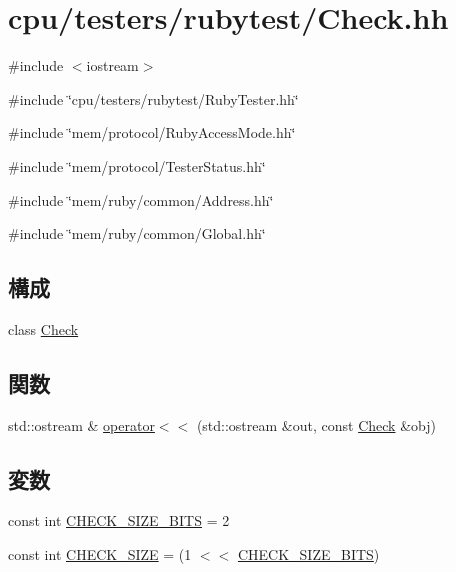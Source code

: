 \hypertarget{Check_8hh}{
\section{cpu/testers/rubytest/Check.hh}
\label{Check_8hh}
}
{\ttfamily \#include $<$iostream$>$}\par
{\ttfamily \#include \char`\"{}cpu/testers/rubytest/RubyTester.hh\char`\"{}}\par
{\ttfamily \#include \char`\"{}mem/protocol/RubyAccessMode.hh\char`\"{}}\par
{\ttfamily \#include \char`\"{}mem/protocol/TesterStatus.hh\char`\"{}}\par
{\ttfamily \#include \char`\"{}mem/ruby/common/Address.hh\char`\"{}}\par
{\ttfamily \#include \char`\"{}mem/ruby/common/Global.hh\char`\"{}}\par
\subsection*{構成}
\begin{DoxyCompactItemize}
\item 
class \hyperlink{classCheck}{Check}
\end{DoxyCompactItemize}
\subsection*{関数}
\begin{DoxyCompactItemize}
\item 
std::ostream \& \hyperlink{Check_8hh_ad904cac29a8613c671ee484b326cbcaa}{operator$<$$<$} (std::ostream \&out, const \hyperlink{classCheck}{Check} \&obj)
\end{DoxyCompactItemize}
\subsection*{変数}
\begin{DoxyCompactItemize}
\item 
const int \hyperlink{Check_8hh_ab082b7c215fc32d2bcf27291d93a616d}{CHECK\_\-SIZE\_\-BITS} = 2
\item 
const int \hyperlink{Check_8hh_a9a4e4d92b84c20d87d22cd139b0781d9}{CHECK\_\-SIZE} = (1 $<$$<$ \hyperlink{Check_8hh_ab082b7c215fc32d2bcf27291d93a616d}{CHECK\_\-SIZE\_\-BITS})
\end{DoxyCompactItemize}


